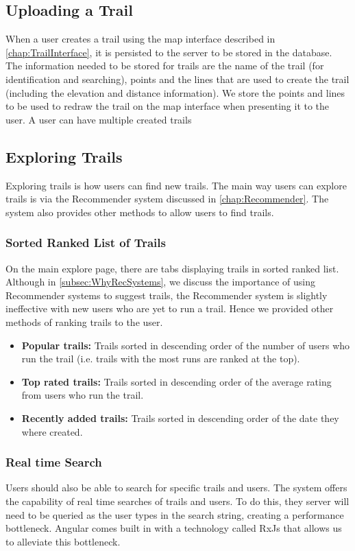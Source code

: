 \subsection{Uploading a Trail}
When a user creates a trail using the map interface described in \autoref{chap:TrailInterface}, it is persisted to the server to be stored in the database. The information needed to be stored for trails are the name of the trail (for identification and searching), points and the lines that are used to create the trail (including the elevation and distance information). We store the points and lines to be used to redraw the trail on the map interface when presenting it to the user. A user can have multiple created trails

\subsection{Exploring Trails}
Exploring trails is how users can find new trails. The main way users can explore trails is via the Recommender system discussed in \autoref{chap:Recommender}. The system also provides other methods to allow users to find trails.

\subsubsection{Sorted Ranked List of Trails}
On the main explore page, there are tabs displaying trails in sorted ranked list. Although in \autoref{subsec:WhyRecSystems}, we discuss the importance of using Recommender systems to suggest trails, the Recommender system is slightly ineffective with new users who are yet to run a trail. Hence we provided other methods of ranking trails to the user.

\begin{itemize}
    \item \textbf{Popular trails:} Trails sorted in descending order of the number of users who run the trail (i.e. trails with the most runs are ranked at the top). 
    \item \textbf{Top rated trails:} Trails sorted in descending order of the average rating from users who run the trail.
    \item \textbf{Recently added trails:} Trails sorted in descending order of the date they where created.
\end{itemize}

\subsubsection{Real time Search}
Users should also be able to search for specific trails and users. The system offers the capability of real time searches of trails and users. To do this, they server will need to be queried as the user types in the search string, creating a performance bottleneck. Angular comes built in with a technology called RxJs that allows us to alleviate this bottleneck.

